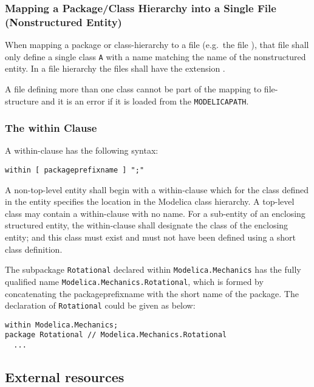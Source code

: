 \subsubsection{Mapping a Package/Class Hierarchy into a Single File (Nonstructured Entity)}\label{mapping-a-package-class-hierarchy-into-a-single-file-nonstructured-entity}

When mapping a package or class-hierarchy to a file (e.g.\ the file ), that file shall only define a single class \lstinline!A! with a
name matching the name of the nonstructured entity. In a file hierarchy the files shall have the extension .

A  file defining more than one class cannot be part of the mapping
to file-structure and it is an error if it is loaded from the
\lstinline!MODELICAPATH!.

\subsubsection{The within Clause}\label{the-within-clause}

A within-clause has the following syntax:
\begin{lstlisting}[language=grammar]
  within [ packageprefixname ] ";"
\end{lstlisting}
  A non-top-level entity shall begin with a within-clause which for the
  class defined in the entity specifies the location in the Modelica class
    hierarchy. A top-level class may contain a within-clause with no name.
    For a sub-entity of an enclosing structured entity, the within-clause
shall designate the class of the enclosing entity; and this class must
exist and must not have been defined using a short class definition.

\begin{example}
The subpackage \lstinline!Rotational! declared within
\lstinline!Modelica.Mechanics! has the fully qualified name
\lstinline!Modelica.Mechanics.Rotational!, which is formed by concatenating
the packageprefixname with the short name of the package. The
declaration of \lstinline!Rotational! could be given as below:
\begin{lstlisting}[language=modelica]
within Modelica.Mechanics;
package Rotational // Modelica.Mechanics.Rotational
  ...
\end{lstlisting}
\end{example}

\subsection{External resources}\label{external-resources}

